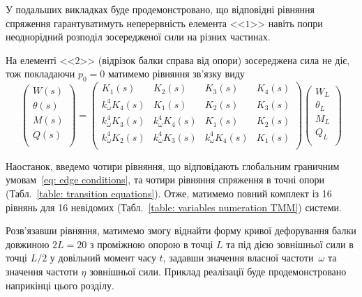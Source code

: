 У подальших викладках буде продемонстровано, що відповідні рівняння спряження гарантуватимуть неперервність елемента <<$1$>> навіть попри неоднорідний розподіл зосередженої сили на різних частинах. 

На елементі <<$2$>> (відрізок балки справа від опори) зосереджена сила не діє, тож покладаючи $p_0=0$ матимемо рівняння зв'язку виду
\begin{equation}\label{eq: matrix inhomo field equations for element 2}
    \begin{pmatrix}
        W(s)      \\
        \theta(s) \\
        M(s)      \\
        Q(s)      \\
    \end{pmatrix} =
    \begin{pmatrix}
        K_1(s)              & K_2(s)              & K_3(s)              & K_4(s) \\
        k_{\omega}^4 K_4(s) & K_1(s)              & K_2(s)              & K_3(s) \\
        k_{\omega}^4 K_3(s) & k_{\omega}^4 K_4(s) & K_1(s)              & K_2(s) \\
        k_{\omega}^4 K_2(s) & k_{\omega}^4 K_3(s) & k_{\omega}^4 K_4(s) & K_1(s) \\
    \end{pmatrix}
    \begin{pmatrix}
        W_L      \\
        \theta_L \\
        M_L      \\
        Q_L      \\
    \end{pmatrix}
\end{equation}

Наостанок, введемо чотири рівняння, що відповідають глобальним граничним умовам~\eqref{eq: edge conditions}, та чотири рівняння спряження в точні опори (Табл.~\ref{table: transition equations}). Отже, матимемо повний комплект із 16 рівнянь для 16 невідомих (Табл.~\ref{table: variables numeration TMM}) системи. 

Розв'язавши рівняння, матимемо змогу віднайти форму кривої дефорування балки довжиною $2L=20$ з проміжною опорою в точці $L$ та під дією зовнішньої сили в точці $L/2$ у довільний момент часу $t$, задавши значення власної частоти~$\omega$ та значення частоти $\eta$ зовнішньої сили. Приклад реалізації буде продемонстровано наприкінці цього розділу.

